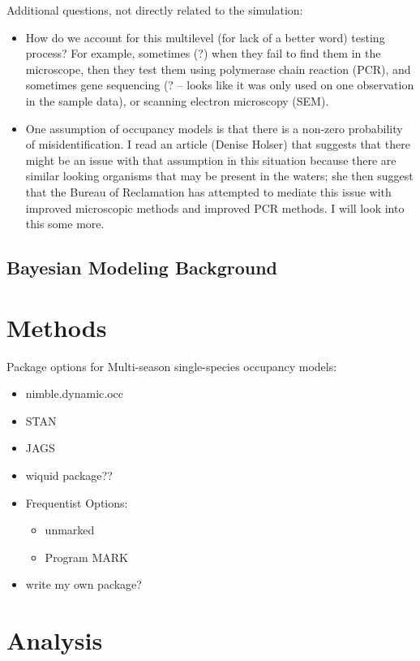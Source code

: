 \documentclass[12pt]{article}\usepackage[]{graphicx}\usepackage[]{color}
\begin{document}
Additional questions, not directly related to the simulation:
\begin{itemize}
	\item How do we account for this multilevel (for lack of a better word) testing process? For example, sometimes (?) when they fail to find them in the microscope, then they test them using polymerase chain reaction (PCR), and sometimes gene sequencing (? -- looks like it was only used on one observation in the sample data), or scanning electron microscopy (SEM).
	\item One assumption of occupancy models is that there is a non-zero probability of misidentification. I read an article (Denise Holser) that suggests that there might be an issue with that assumption in this situation because there are similar looking organisms that may be present in the waters; she then suggest that the Bureau of Reclamation has attempted to mediate this issue with improved microscopic methods and improved PCR methods. I will look into this some more.   
\end{itemize}

 
\subsection{Bayesian Modeling Background}

\section{Methods}

Package options for Multi-season single-species occupancy models: 
\begin{itemize}
\item nimble.dynamic.occ
\item STAN
\item JAGS
\item wiquid package??
\item Frequentist Options: 
  \begin{itemize}
  \item unmarked
  \item Program MARK
  \end{itemize}
\item write my own package? 
\end{itemize}

\section{Analysis}
\end{document}
